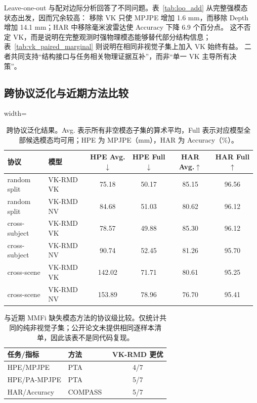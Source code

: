 \documentclass[journal]{IEEEtran}
\begin{document}
Leave-one-out 与配对边际分析回答了不同问题。表~\ref{tab:loo_add} 从完整强模态状态出发，因而冗余较高：
移除 VK 只使 MPJPE 增加 1.6 mm，而移除 Depth 增加 14.1 mm；HAR 中移除毫米波雷达使 Accuracy 下降 6.9 个百分点。
这不否定 VK，而是说明在完整观测时强物理模态能够替代部分结构信息；表~\ref{tab:vk_paired_marginal} 则说明在相同非视觉子集上加入 VK 始终有益。
二者共同支持“结构接口与任务相关物理证据互补”，而非“单一 VK 主导所有决策”。

\subsection{跨协议泛化与近期方法比较}

\begin{table}[H]
\centering
\caption{跨协议泛化结果。Avg. 表示所有非空模态子集的算术平均，Full 表示对应模型全部候选模态均可用；HPE 为 MPJPE（mm），HAR 为 Accuracy（\%）。}
\label{tab:protocol_add}
\footnotesize
\begin{adjustbox}{width=\columnwidth}
\begin{tabular}{llcccc}
\toprule
协议 & 模型 & HPE Avg.$\downarrow$ & HPE Full$\downarrow$ & HAR Avg.$\uparrow$ & HAR Full$\uparrow$ \\
\midrule
random split & VK-RMD VK & 75.18 & 50.17 & 85.15 & 96.56 \\
random split & VK-RMD NV & 84.68 & 51.03 & 80.62 & 96.12 \\
cross-subject & VK-RMD VK & 78.57 & 49.88 & 85.30 & 96.12 \\
cross-subject & VK-RMD NV & 90.74 & 52.45 & 81.26 & 95.70 \\
cross-scene & VK-RMD VK & 142.02 & 71.71 & 80.61 & 95.25 \\
cross-scene & VK-RMD NV & 153.89 & 78.96 & 76.70 & 95.41 \\
\bottomrule
\end{tabular}
\end{adjustbox}
\end{table}

\begin{table}[H]
\centering
\caption{与近期 MMFi 缺失模态方法的协议级比较。仅统计共同的纯非视觉子集；公开论文未提供相同逐样本清单，因此该表不是同代码复现。}
\label{tab:recent_mmfi}
\footnotesize
\begin{tabular}{llc}
\toprule
任务/指标 & 方法 & VK-RMD 更优 \\
\midrule
HPE/MPJPE & PTA~\cite{pta2026} & 4/7 \\
HPE/PA-MPJPE & PTA~\cite{pta2026} & 5/7 \\
HAR/Accuracy & COMPASS~\cite{compass2026} & 5/7 \\
\bottomrule
\end{tabular}
\end{table}
\end{document}
